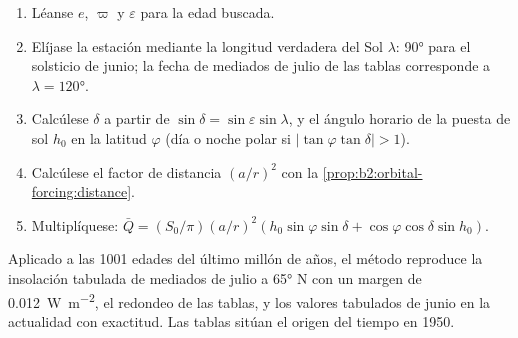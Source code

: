 \begin{method}\label{met:b2:orbital-forcing:curve}
\begin{enumerate}
  \item Léanse $e$, $\varpi$ y $\varepsilon$ para la edad buscada.
  \item Elíjase la estación mediante la longitud verdadera del Sol $\lambda$: \ang{90} para el solsticio de junio;
        la fecha de mediados de julio de las tablas corresponde a $\lambda = \ang{120}$.
  \item Calcúlese $\delta$ a partir de $\sin\delta = \sin\varepsilon\sin\lambda$, y el ángulo horario de la
        puesta de sol $h_0$ en la latitud $\varphi$ (día o noche polar si $|\tan\varphi\tan\delta| > 1$).
  \item Calcúlese el factor de distancia $(a/r)^2$ con la \cref{prop:b2:orbital-forcing:distance}.
  \item Multiplíquese: $\bar Q = (S_0/\pi)(a/r)^2(h_0\sin\varphi\sin\delta +
        \cos\varphi\cos\delta\sin h_0)$.
\end{enumerate}
\end{method}

Aplicado a las 1001 edades del último millón de años, el método reproduce la insolación tabulada de mediados de julio
a \ang{65} N con un margen de \qty{0.012}{W.m^{-2}}, el redondeo de las tablas, y los
valores tabulados de junio en la actualidad con exactitud. Las tablas sitúan el origen del tiempo en 1950.

